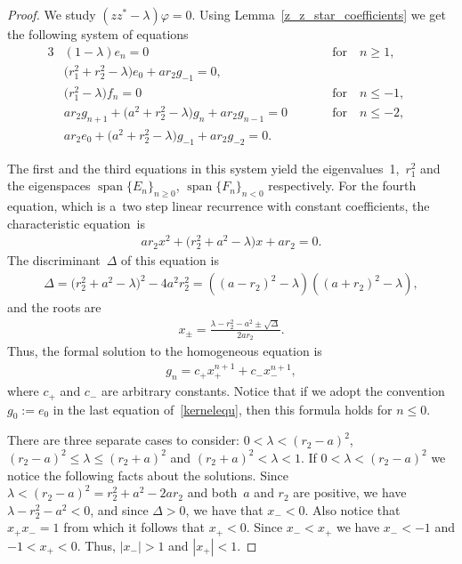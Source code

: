 \begin{proof}
We study $(zz^*-\lambda)\varphi=0$.
Using Lemma~\ref{z_z_star_coefficients} we get the following system of equations
\begin{alignat}{3}
& (1-\lambda)e_n=0 && \text{for}\quad n\ge1,&\nonumber
\\
 & \big(r_1^2+ r_2^2-\lambda\big)e_0+ar_2g_{-1}=0,&&&\nonumber
\\
&\big(r_1^2-\lambda\big)f_n=0 &&\text{for}\quad n\le-1,& \label{kernelequ}
\\
& ar_2g_{n+1}+\big(a^2+r_2^2-\lambda\big)g_n+ar_2g_{n-1}=0 \qquad && \text{for}\quad n\le-2,&\nonumber
\\
 & ar_2e_0+\big(a^2+r_2^2-\lambda\big)g_{-1}+ar_2g_{-2}=0.&&&\nonumber
\end{alignat}

The f\/irst and the third equations in this system yield the eigenvalues~1,~$r_1^2$ and the eigenspaces
$\operatorname{span} \{E_n\}_{n\geq 0}$, $\operatorname{span}\{F_n\}_{n< 0}$ respectively.
For the fourth equation, which is a~two step linear recurrence with constant coef\/f\/icients, the characteristic equation~is
\begin{gather*}
ar_2x^2+\big(r_2^2+a^2-\lambda\big)x+ar_2= 0.
\end{gather*}
The discriminant~$\Delta$ of this equation is
\begin{gather*}
\Delta=\big(r_2^2+a^2-\lambda\big)^2-4a^2r_2^2=\left((a-r_2)^2-\lambda\right)\left((a+r_2)^2-\lambda\right),
\end{gather*}
and the roots are
\begin{gather*}
x_{\pm}=\frac{\lambda-r_2^2-a^2 \pm \sqrt{\Delta}}{2ar_2}.
\end{gather*}
Thus, the formal solution to the homogeneous equation is
\begin{gather}
\label{ghomsol}
g_n=c_+x_+^{n+1}+c_-x_-^{n+1},
\end{gather}
where $c_+$ and $c_-$ are arbitrary constants.
Notice that if we adopt the convention $g_0:=e_0$ in the last equation of~\eqref{kernelequ}, then this formula holds for
$n\le 0$.

There are three separate cases to consider: $0<\lambda<(r_2-a)^2$, $(r_2-a)^2\leq \lambda\leq (r_2+a)^2$ and
$(r_2+a)^2<\lambda<1$.
If $0<\lambda<(r_2-a)^2$ we notice the following facts about the solutions.
Since $\lambda<(r_2-a)^2=r_2^2+a^2-2ar_2$ and both~$a$ and $r_2$ are positive, we have $\lambda-r_2^2-a^2<0$, and
since $\Delta>0$, we have that $x_-<0$.
Also notice that $x_+x_-=1$ from which it follows that $x_+<0$.
Since $x_-<x_+$ we have $x_-<-1$ and $-1<x_+<0$.
Thus, $|x_-|>1$ and $|x_+|<1$.


\end{proof}

